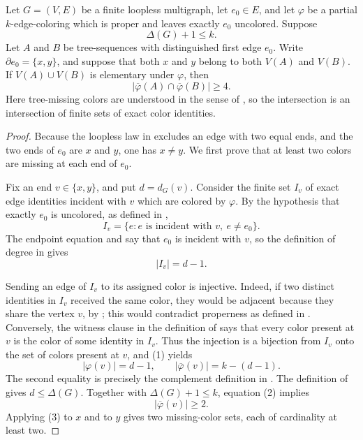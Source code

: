 \begin{lemma}
Let $G=(V,E)$ be a finite loopless multigraph, let $e_0\in E$, and let
$\varphi$ be a partial $k$-edge-coloring which is proper and leaves exactly
$e_0$ uncolored.  Suppose
\[
                    \Delta(G)+1\leq k.
\]
Let $A$ and $B$ be tree-sequences with distinguished first edge $e_0$.
Write $\partial e_0=\{x,y\}$, and suppose that both $x$ and $y$ belong to
both $V(A)$ and $V(B)$.  If $V(A)\cup V(B)$ is elementary under
$\varphi$, then
\[
 \bigl|\overline\varphi(A)\cap\overline\varphi(B)\bigr|\geq 4.
\]
Here tree-missing colors are understood in the sense of
, so the intersection is an intersection of
finite sets of exact color identities.
\end{lemma}
\begin{proof}
Because the loopless law in  excludes an edge
with two equal ends, and the two ends of $e_0$ are $x$ and $y$, one has
$x\ne y$.  We first prove that at least two colors are missing at each end
of $e_0$.

Fix an end $v\in\{x,y\}$, and put $d=d_G(v)$.  Consider the finite set
$I_v$ of exact edge identities incident with $v$ which are colored by
$\varphi$.  By the hypothesis that exactly $e_0$ is uncolored, as defined
in ,
\[
                    I_v=\{e:e\text{ is incident with }v,\ e\ne e_0\}.
\]
The endpoint equation and  say that $e_0$ is incident
with $v$, so the definition of degree in  gives
\[
                         |I_v|=d-1.                              \tag{1}
\]

Sending an edge of $I_v$ to its assigned color is injective.  Indeed, if
two distinct identities in $I_v$ received the same color, they would be
adjacent because they share the vertex $v$, by
; this would contradict properness as defined in
.  Conversely, the witness clause in the
definition of  says that every color present at
$v$ is the color of some identity in $I_v$.  Thus the injection is a
bijection from $I_v$ onto the set of colors present at $v$, and (1) yields
\[
             |\varphi(v)|=d-1,
             \qquad |\overline\varphi(v)|=k-(d-1).              \tag{2}
\]
The second equality is precisely the complement definition in
.
The definition of  gives $d\leq\Delta(G)$.
Together with $\Delta(G)+1\leq k$, equation (2) implies
\[
                         |\overline\varphi(v)|\geq 2.            \tag{3}
\]
Applying (3) to $x$ and to $y$ gives two missing-color sets, each of
cardinality at least two.


\end{proof}
